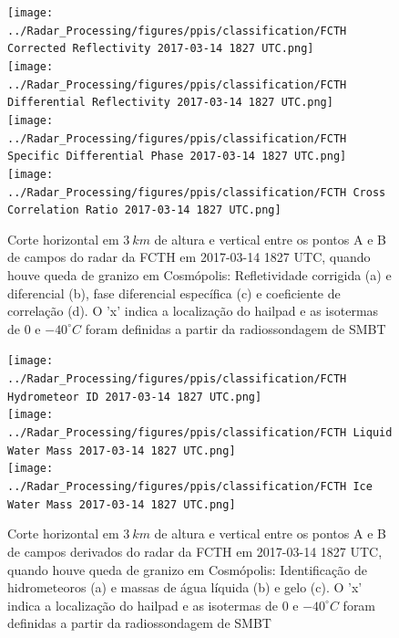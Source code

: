 \begin{figure}[hp]
	\centering
	\caption{Corte horizontal em $3\:km$ de altura e vertical entre os pontos A e B de campos do radar da FCTH em 2017-03-14 1827 UTC, quando houve queda de granizo em Cosmópolis: Refletividade corrigida (a) e diferencial (b), fase diferencial específica (c) e coeficiente de correlação (d). O 'x' indica a localização do hailpad e as isotermas de $0$ e $-40^{\circ}C$ foram definidas a partir da radiossondagem de SMBT}
	\label{radar_20170314_1}
	\vspace{-5pt}
	\texttt{[image: ../Radar\_Processing/figures/ppis/classification/FCTH Corrected Reflectivity 2017-03-14 1827 UTC.png]}
		\label{z_20170314_1} \\
	\vspace{-15pt}
	\texttt{[image: ../Radar\_Processing/figures/ppis/classification/FCTH Differential Reflectivity 2017-03-14 1827 UTC.png]}
		\label{zdr_20170314_1} \\
	\vspace{-15pt}
	\texttt{[image: ../Radar\_Processing/figures/ppis/classification/FCTH Specific Differential Phase 2017-03-14 1827 UTC.png]}
		\label{kdp_20170314_1} \\
	\vspace{-15pt}
	\texttt{[image: ../Radar\_Processing/figures/ppis/classification/FCTH Cross Correlation Ratio 2017-03-14 1827 UTC.png]}
		\label{rho_20170314_1} \\
	\vspace{-5pt}
\end{figure}

\begin{figure}[htb]
	\centering
	\caption{Corte horizontal em $3\:km$ de altura e vertical entre os pontos A e B de campos derivados do radar da FCTH em 2017-03-14 1827 UTC, quando houve queda de granizo em Cosmópolis: Identificação de hidrometeoros (a) e massas de água líquida (b) e gelo (c). O 'x' indica a localização do hailpad e as isotermas de $0$ e $-40^{\circ}C$ foram definidas a partir da radiossondagem de SMBT} 
	\label{radar_derived_20170314_1}
	\vspace{-5pt}
	\texttt{[image: ../Radar\_Processing/figures/ppis/classification/FCTH Hydrometeor ID 2017-03-14 1827 UTC.png]}
		\label{hid_20170314_1} \\
	\vspace{-15pt}
	\texttt{[image: ../Radar\_Processing/figures/ppis/classification/FCTH Liquid Water Mass 2017-03-14 1827 UTC.png]}
		\label{ml_20170314_1} \\
	\vspace{-15pt}
	\texttt{[image: ../Radar\_Processing/figures/ppis/classification/FCTH Ice Water Mass 2017-03-14 1827 UTC.png]}
		\label{mi_20170314_1} \\
	\vspace{-5pt}
\end{figure}


